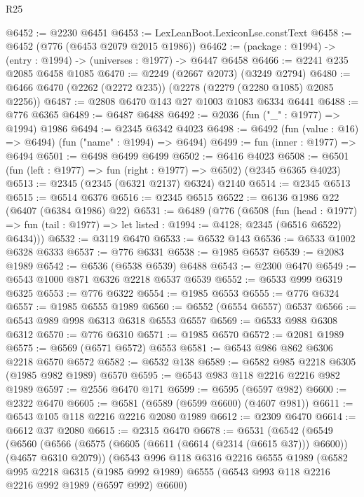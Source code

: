 \begin{lexlean}{R25}
\begin{coremodule}
@6452 := @2230 @6451
@6453 := LexLeanBoot.LexiconLse.constText
@6458 := @6452 (@776 (@6453 @2079 @2015 @1986))
@6462 := (package : @1994) -> (entry : @1994) -> (universes : @1977) -> @6447 @6458
@6466 := @2241 @235 @2085 @6458 @1085
@6470 := @2249 (@2667 @2073) (@3249 @2794)
@6480 := @6466 @6470 (@2262 (@2272 @235)) (@2278 (@2279 (@2280 @1085) @2085 @2256))
@6487 := @2808 @6470 @143 @27 @1003 @1083 @6334 @6441
@6488 := @776 @6365
@6489 := @6487 @6488
@6492 := @2036 (fun ("_" : @1977) => @1994) @1986
@6494 := @2345 @6342 @4023
@6498 := @6492 (fun (value : @16) => @6494) (fun ("name" : @1994) => @6494)
@6499 := fun (inner : @1977) => @6494
@6501 := @6498 @6499 @6499
@6502 := @6416 @4023
@6508 := @6501 (fun (left : @1977) => fun (right : @1977) => @6502) (@2345 @6365 @4023)
@6513 := @2345 (@2345 (@6321 @2137) @6324) @2140
@6514 := @2345 @6513
@6515 := @6514 @6376
@6516 := @2345 @6515
@6522 := @6136 @1986 @22 (@6407 (@6384 @1986) @22)
@6531 := @6489
    (@776
      (@6508
        (fun (head : @1977) =>
        fun (tail : @1977) => let listed : @1994 := @4128; @2345 (@6516 @6522) @6434)))
@6532 := @3119 @6470
@6533 := @6532 @143
@6536 := @6533 @1002 @6328 @6333
@6537 := @776 @6331
@6538 := @1985 @6537
@6539 := @2083 @1989
@6542 := @6536 (@6538 @6539) @6488
@6543 := @2300 @6470
@6549 := @6543 @1000 @871 @6326 @2218 @6537 @6539
@6552 := @6533 @999 @6319 @6325
@6553 := @776 @6322
@6554 := @1985 @6553
@6555 := @776 @6324
@6557 := @1985 @6555 @1989
@6560 := @6552 (@6554 @6557) @6537
@6566 := @6543 @989 @998 @6313 @6318 @6553 @6557
@6569 := @6533 @988 @6308 @6312
@6570 := @776 @6310
@6571 := @1985 @6570
@6572 := @2081 @1989
@6575 := @6569 (@6571 @6572) @6553
@6581 := @6543 @986 @862 @6306 @2218 @6570 @6572
@6582 := @6532 @138
@6589 := @6582 @985 @2218 @6305 (@1985 @982 @1989) @6570
@6595 := @6543 @983 @118 @2216 @2216 @982 @1989
@6597 := @2556 @6470 @171
@6599 := @6595 (@6597 @982)
@6600 := @2322 @6470
@6605 := @6581 (@6589 (@6599 @6600) (@4607 @981))
@6611 := @6543 @105 @118 @2216 @2216 @2080 @1989
@6612 := @2309 @6470
@6614 := @6612 @37 @2080
@6615 := @2315 @6470
@6678 := @6531
    (@6542
      (@6549
        (@6560
          (@6566
            (@6575 (@6605 (@6611 (@6614 (@2314 (@6615 @37))) @6600)) (@4657 @6310 @2079))
            (@6543
              @996
              @118
              @6316
              @2216
              @6555
              @1989
              (@6582
                @995
                @2218
                @6315
                (@1985 @992 @1989)
                @6555
                (@6543 @993 @118 @2216 @2216 @992 @1989 (@6597 @992) @6600)

\end{coremodule}
\end{lexlean}
